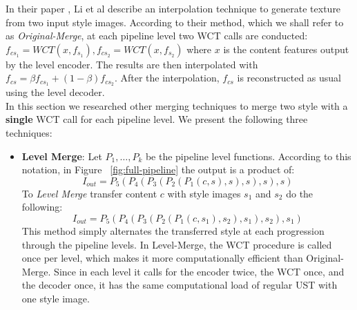 In their paper \cite{bib11}, Li et al describe an interpolation technique to generate texture from two input style images. According to their method, which we shall refer to as \textit{Original-Merge}, at each pipeline level two WCT calls are conducted: $f_{cs_1} = WCT(x, f_{s_1}), f_{cs_2} = WCT(x, f_{s_2})$ where $x$ is the content features output by the level encoder. The results are then interpolated with $f_{cs} = \beta f_{cs_1} + (1-\beta)f_{cs_2}$. After the interpolation, $f_{cs}$ is reconstructed as usual using the level decoder.\\

In this section we researched other merging techniques to merge two style with a \textbf{single} WCT call for each pipeline level. We present the following three techniques:

\begin{itemize}
	\item \textbf{Level Merge}: Let $P_1, \dots, P_k$ be the pipeline level functions. According to this notation, in Figure ~\ref{fig:full-pipeline} the output is a product of:
	\begin{equation*}
	I_{out} = P_5 ( P_4 ( P_3 ( P_2 ( P_1 (c,s),s) ,s),s), s)
	\end{equation*}
	To \textit{Level Merge} transfer content $c$ with style images $s_1$ and $s_2$ do the following:
	\begin{equation*}
	I_{out} = P_5 ( P_4 ( P_3 ( P_2 ( P_1 (c, s_1), s_2), s_1), s_2), s_1)
	\end{equation*}
	This method simply alternates the transferred style at each progression through the pipeline levels. In Level-Merge, the WCT procedure is called once per level, which makes it more computationally efficient than Original-Merge. Since in each level it calls for the encoder twice, the WCT once, and the decoder once, it has the same computational load of regular UST with one style image.
	 

\end{itemize}
